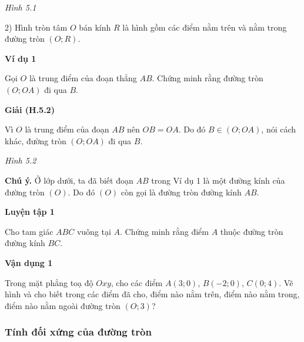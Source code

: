 \begin{lesson}
\begin{center}
        \textit{Hình 5.1}
    \end{center}

    2) Hình tròn tâm $O$ bán kính $R$ là hình gồm các điểm nằm trên và nằm trong đường tròn $(O;R)$.

    \textbf{Ví dụ 1}

    Gọi $O$ là trung điểm của đoạn thẳng $AB$. Chứng minh rằng đường tròn $(O;OA)$ đi qua $B$.

    \textbf{Giải (H.5.2)}

    Vì $O$ là trung điểm của đoạn $AB$ nên $OB=OA$. Do đó $B\in(O;OA)$, nói cách khác, đường tròn $(O;OA)$ đi qua $B$.

    \begin{center}

        \textit{Hình 5.2}
    \end{center}

    \textbf{Chú ý.} Ở lớp dưới, ta đã biết đoạn $AB$ trong Ví dụ 1 là một đường kính của đường tròn $(O)$. Do đó $(O)$ còn gọi là đường tròn đường kính $AB$.

    \textbf{Luyện tập 1}

    Cho tam giác $ABC$ vuông tại $A$. Chứng minh rằng điểm $A$ thuộc đường tròn đường kính $BC$.

    \answerline
    \answerline

    \textbf{Vận dụng 1}

    Trong mặt phẳng toạ độ $Oxy$, cho các điểm $A(3;0)$, $B(-2;0)$, $C(0;4)$. Vẽ hình và cho biết trong các điểm đã cho, điểm nào nằm trên, điểm nào nằm trong, điểm nào nằm ngoài đường tròn $(O;3)$?

    \answerline
    \answerline

    \subsubsection{Tính đối xứng của đường tròn}


\end{lesson}
